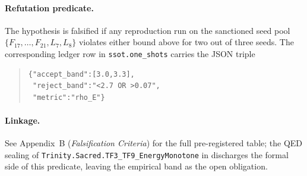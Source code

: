\paragraph{Refutation predicate.}
The hypothesis is falsified if any reproduction run on the sanctioned seed
pool $\{F_{17},\dots,F_{21},L_7,L_8\}$ violates either bound above for two
out of three seeds. The corresponding ledger row in
\texttt{ssot.one\_shots} carries the JSON triple
\begin{quote}\footnotesize
\begin{verbatim}
{"accept_band":[3.0,3.3],
 "reject_band":"<2.7 OR >0.07",
 "metric":"rho_E"}
\end{verbatim}
\end{quote}

\paragraph{Linkage.}
See Appendix~B (\emph{Falsification Criteria}) for the full pre-registered
table; the QED sealing of \texttt{Trinity.Sacred.TF3\_TF9\_EnergyMonotone} in
 discharges the formal side of this
predicate, leaving the empirical band as the open obligation.
